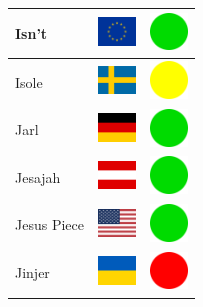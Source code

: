 \documentclass[12pt, a4paper, twoside]{report}
\begin{document}
\begin{center}
\begin{longtable}{|p{5cm}|p{2cm}|p{2cm}|}
 Isn't                                                      & \includegraphics[width=1cm]{../img/flags/eu} &   \includegraphics[width=1cm]{../likes/y} \\ \hline
 Isole                                                      & \includegraphics[width=1cm]{../img/flags/se} &   \includegraphics[width=1cm]{../likes/m} \\ \hline
 Jarl                                                       & \includegraphics[width=1cm]{../img/flags/de} &   \includegraphics[width=1cm]{../likes/y} \\ \hline
 Jesajah                                                    & \includegraphics[width=1cm]{../img/flags/at} &   \includegraphics[width=1cm]{../likes/y} \\ \hline
 Jesus Piece                                                & \includegraphics[width=1cm]{../img/flags/us} &   \includegraphics[width=1cm]{../likes/y} \\ \hline
 Jinjer                                                     & \includegraphics[width=1cm]{../img/flags/ua} &   \includegraphics[width=1cm]{../likes/n} \\ \hline

\end{longtable}
\end{center}
\end{document}
